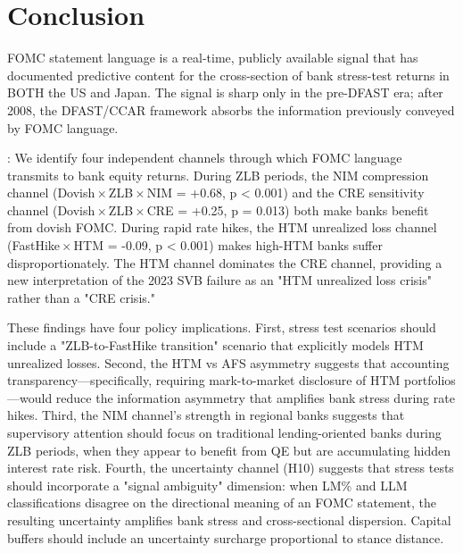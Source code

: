 \documentclass[12pt,a4paper]{article}
\begin{document}
\section{Conclusion}

FOMC statement language is a real-time, publicly available signal that has documented predictive content for the cross-section of bank stress-test returns in BOTH the US and Japan. The signal is sharp only in the pre-DFAST era; after 2008, the DFAST/CCAR framework absorbs the information previously conveyed by FOMC language.

: We identify four independent channels through which FOMC language transmits to bank equity returns. During ZLB periods, the NIM compression channel (Dovish\,$\times$\,ZLB\,$\times$\,NIM = +0.68, p < 0.001) and the CRE sensitivity channel (Dovish\,$\times$\,ZLB\,$\times$\,CRE = +0.25, p = 0.013) both make banks benefit from dovish FOMC. During rapid rate hikes, the HTM unrealized loss channel (FastHike\,$\times$\,HTM = -0.09, p < 0.001) makes high-HTM banks suffer disproportionately. The HTM channel dominates the CRE channel, providing a new interpretation of the 2023 SVB failure as an "HTM unrealized loss crisis" rather than a "CRE crisis."

These findings have four policy implications. First, stress test scenarios should include a "ZLB-to-FastHike transition" scenario that explicitly models HTM unrealized losses. Second, the HTM vs AFS asymmetry suggests that accounting transparency—specifically, requiring mark-to-market disclosure of HTM portfolios—would reduce the information asymmetry that amplifies bank stress during rate hikes. Third, the NIM channel's strength in regional banks suggests that supervisory attention should focus on traditional lending-oriented banks during ZLB periods, when they appear to benefit from QE but are accumulating hidden interest rate risk. Fourth, the uncertainty channel (H10) suggests that stress tests should incorporate a "signal ambiguity" dimension: when LM\% and LLM classifications disagree on the directional meaning of an FOMC statement, the resulting uncertainty amplifies bank stress and cross-sectional dispersion. Capital buffers should include an uncertainty surcharge proportional to stance distance.


\newpage
\end{document}

